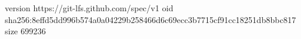 version https://git-lfs.github.com/spec/v1
oid sha256:8effd5dd996b574a0a04229b258466d6c69ecc3b7715cf91cc18251db8bbc817
size 699236
